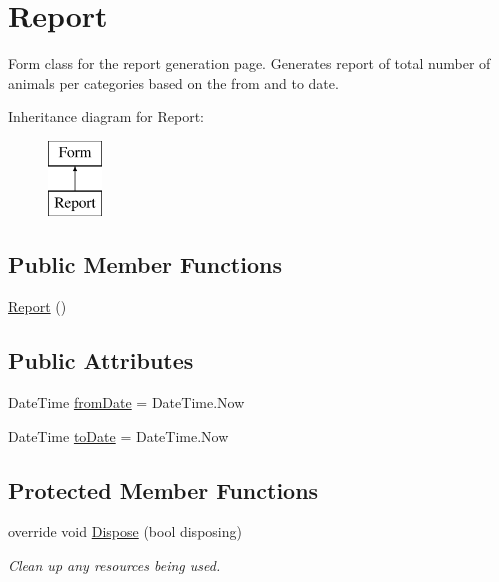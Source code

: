 \hypertarget{classWildlifeTrackingApp_1_1Report}{}\section{Report}
\label{classWildlifeTrackingApp_1_1Report}


Form class for the report generation page. Generates report of total number of animals per categories based on the from and to date.  


Inheritance diagram for Report\+:\begin{figure}[H]
\begin{center}
\leavevmode
\includegraphics[height=2.000000cm]{classWildlifeTrackingApp_1_1Report}
\end{center}
\end{figure}
\subsection*{Public Member Functions}
\begin{DoxyCompactItemize}
\item 
\hyperlink{classWildlifeTrackingApp_1_1Report_a62bc0d20ce17d1ee1289cfccd4c0ce68}{Report} ()
\end{DoxyCompactItemize}
\subsection*{Public Attributes}
\begin{DoxyCompactItemize}
\item 
Date\+Time \hyperlink{classWildlifeTrackingApp_1_1Report_a3ee65fd5edda8ee4040edc92e50acfc5}{from\+Date} = Date\+Time.\+Now
\item 
Date\+Time \hyperlink{classWildlifeTrackingApp_1_1Report_a6c861174d14c06304507891ae7ee89cf}{to\+Date} = Date\+Time.\+Now
\end{DoxyCompactItemize}
\subsection*{Protected Member Functions}
\begin{DoxyCompactItemize}
\item 
override void \hyperlink{classWildlifeTrackingApp_1_1Report_a849c3c7f8d08104f0cdb46bee9fe6389}{Dispose} (bool disposing)
\begin{DoxyCompactList}\small\item\em Clean up any resources being used. \end{DoxyCompactList}\end{DoxyCompactItemize}
